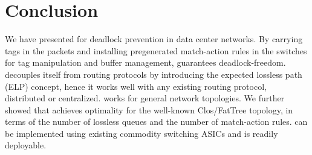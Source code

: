 \section{Conclusion}\label{sec:conclusion}
We have presented \sysname{}  for deadlock prevention in data center
networks. By carrying tags in the packets and installing pregenerated
match-action rules in the switches for tag manipulation and buffer
management, \sysname{}  guarantees deadlock-freedom. \sysname{} decouples
itself from routing protocols by introducing the expected lossless path
(ELP) concept, hence it works well with any existing routing protocol,
distributed or centralized. \sysname{}  works for general network
topologies. We further showed that \sysname{}  achieves optimality for
the well-known Clos/FatTree topology, in terms of the number of lossless queues and
the number of match-action rules. \sysname{}  can be implemented using
existing commodity switching ASICs and is readily deployable.
